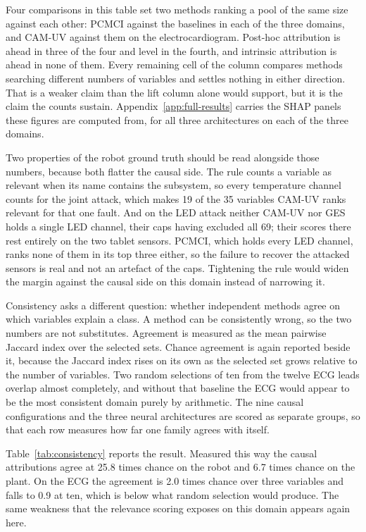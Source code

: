 Four comparisons in this table set two methods ranking a pool of the same size
against each other: PCMCI against the baselines in each of the three domains, and
CAM-UV against them on the electrocardiogram. Post-hoc attribution is ahead in
three of the four and level in the fourth, and intrinsic attribution is ahead in
none of them. Every remaining cell of the column compares methods searching
different numbers of variables and settles nothing in either direction.
That is a weaker claim than the lift column alone would support, but it is the claim the counts
sustain. Appendix~\ref{app:full-results} carries the SHAP panels
these figures are computed from, for all three architectures on each of the
three domains.

Two properties of the robot ground truth should be read alongside those numbers,
because both flatter the causal side. The rule counts a variable as relevant when
its name contains the subsystem, so every temperature channel counts for the
joint attack, which makes 19 of the 35 variables CAM-UV ranks relevant for that
one fault. And on the LED attack neither CAM-UV nor GES holds a single LED
channel, their caps having excluded all 69; their scores there rest entirely on
the two tablet sensors. PCMCI, which holds every LED channel, ranks none of them
in its top three either, so the failure to recover the attacked sensors is real and not an artefact of the caps. Tightening the rule would widen the margin
against the causal side on this domain instead of narrowing it.

Consistency asks a different question: whether independent methods agree on
which variables explain a class. A method can be consistently wrong, so the two
numbers are not substitutes. Agreement is measured as the mean pairwise Jaccard
index over the selected sets. Chance agreement is again reported beside it,
because the Jaccard index rises on its own as the selected set grows relative to
the number of variables. Two random selections of ten from the twelve ECG leads
overlap almost completely, and without that baseline the ECG would appear to be
the most consistent domain purely by arithmetic. The nine causal configurations
and the three neural architectures are scored as separate groups, so that each
row measures how far one family agrees with itself.



Table~\ref{tab:consistency} reports the result. Measured this way the causal attributions agree at 25.8 times chance on the
robot and 6.7 times chance on the plant. On the ECG the agreement is 2.0 times
chance over three variables and falls to 0.9 at ten, which is below what random
selection would produce. The same weakness that the relevance scoring exposes
on this domain appears again here.

